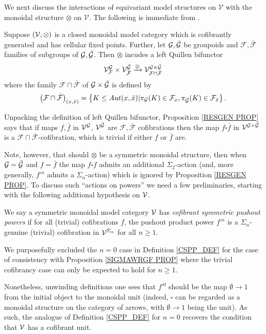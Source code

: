 \documentclass[a4paper,10pt
,draft
]{article}%
\renewcommand{\F}{\mathcal F}
\renewcommand{\1}{\eta}%
\begin{document}
We next discuss the interactions of equivariant model structures on 
$\mathcal{V}$ with the monoidal structure $\otimes$ on $\mathcal{V}$.
The following is immediate from
\cite[Rem. 6.14]{BP_geo}.


\begin{proposition}\label{RESGEN PROP}
Suppose $(\mathcal V, \otimes)$ is a closed monoidal model category which is cofibrantly generated and has cellular fixed points.
Further, let $\mathcal{G}, \bar{\mathcal{G}}$ be groupoids and $\F,\bar{\F}$
families of subgroups of $\mathcal{G}, \bar{\mathcal{G}}$.
Then $\otimes$ incudes a left Quillen bifunctor
\[
	\V^{\G}_{\F} \times \V^{\bar \G}_{\bar{\F}} \xrightarrow{\otimes} \V^{\G \times \bar \G}_{\F \sqcap \bar{\F}}
\]
where the family $\F \sqcap \bar{\F}$ of $\mathcal{G} \times \bar{\mathcal{G}}$ is defined by
\[
\left(\F \sqcap \bar{\F}\right)_{(x,\bar{x})}
=
\left\{K\leq Aut(x,\bar{x}) | \pi_{\G} (K) \in \F_x,
\pi_{\bar{\G}} (K) \in \F_{\bar{x}}
\right\}.
\]
\end{proposition}

Unpacking the definition of left Quillen bifunctor,
Proposition \ref{RESGEN PROP}
says that if maps
$f, \bar{f}$
in 
$\mathcal V^{\mathcal{G}}$,
$\mathcal V^{\bar{\mathcal{G}}}$
are 
$\F,\bar{\F}$
cofibrations
then the map
$f\square \bar{f}$
in $\mathcal{V}^{\mathcal{G} \times \bar{\mathcal{G}}}$
is a 
$\F \sqcap \bar{\F}$-cofibration,
which is trivial if either $f$ or $\bar{f}$ are.

Note, however, that should $\otimes$ be a symmetric monoidal structure, then when $\mathcal{G} = \bar {\mathcal{G}}$ and $f = \bar f$
the map $f \square f$
admits an additional $\Sigma_2$-action
(and, more generally, $f^{\square n}$ admits a $\Sigma_n$-action)
which is ignored by Proposition \ref{RESGEN PROP}.
To discuss such ``actions on powers'' we need a few preliminaries, 
starting with the following additional hypothesis on $\mathcal V$.


\begin{definition}\label{CSPP_DEF}
      We say a symmetric monoidal model category $\mathcal V$ has \textit{cofibrant symmetric pushout powers} if
      for all (trivial) cofibrations $f$, the pushout product power $f^{\square n}$
      is a $\Sigma_n$-genuine (trivial) cofibration in $\mathcal V^{\Sigma_n}$ for all $n \geq 1$. 
\end{definition}

\begin{remark}
We purposefully excluded the $n=0$ case in Definition \ref{CSPP_DEF}
for the case of consistency with Proposition \ref{SIGMAWRGF PROP}
where the trivial cofibrancy case can only be expected to hold for $n\geq 1$.

Nonetheless, unwinding definitions one sees that
$f^{\square 0}$
should be the map 
$\emptyset \to 1$
from the initial object to the monoidal unit
(indeed, $\square$ can be regarded as a monoidal structure on the category of arrows, with $\emptyset \to 1$ being the unit).
As such, the analogue of Definition \ref{CSPP_DEF} for $n=0$ 
recovers the condition that $\mathcal V$ has a cofibrant unit.
\end{remark}
\end{document}
